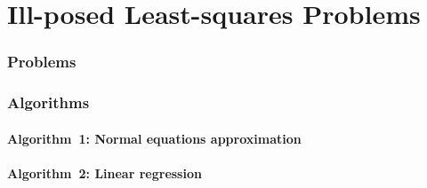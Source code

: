 \documentclass[a4paper]{article}
\newcommand{\labbase}{}
\let\OrigLstInputListing
\renewcommand{}[2][]{\OrigLstInputListing[#1]{\labbase#2}}
\begin{document}
\part{Ill-posed Least-squares Problems}

\renewcommand{\labbase}{lab3/}

\section{Problems}








\clearpage

\section{Algorithms}
\subsection{Algorithm~1: Normal equations approximation}%
\label{lab3:algorithm:1}

\subsection{Algorithm~2: Linear regression}%
\label{lab3:algorithm:2}



\clearpage

\nocite{Zdunek, GoluVanl96, Meyer, Gerschgorin, Zarowski, Demmel}


\end{document}
